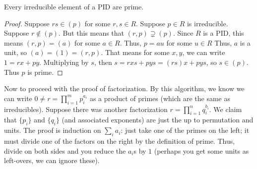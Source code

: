 \begin{theorem}
    Every irreducible element of a PID are prime.
    \begin{proof}
        Suppose $rs \in (p)$ for some $r,s \in R$. Suppose $p\in R$ is irreducible. Suppose $r \notin (p)$. But this means that $(r, p) \supsetneq (p)$.
        Since $R$ is a PID, this means $(r, p) = (a)$ for some $a \in R$. Thus, $p = au$ for some $u \in R$
        Thus, $a$ is a unit, so $(a) = (1) = (r, p)$. That means for some $x, y$, we can write $1 = rx + py$. Multiplying by $s$,
        then $s = rxs + pys = (rs)x + pys$, so $s \in (p)$. Thus $p$ is prime.
    \end{proof}
\end{theorem}
Now to proceed with the proof of factorization. By this algorithm,
we know we can write $0 \neq r = \prod_{i = 1}^m p_i^{a_i}$ as a product of primes (which are the same as irreducibles).
Suppose there was another factorization $r = \prod_{i = 1}^n q_i^{b_i}$. We claim that $\{p_i\}$ and $\{q_i\}$ (and associated exponents)
are just the up to permutation and units. The proof is induction on $\sum_i a_i$: just take one of the primes on the left; it must divide one of the factors on the right
by the definition of prime. Thus, divide on both sides and you reduce the $a_i$s by $1$ (perhaps you get some units as left-overs, we can ignore these).
